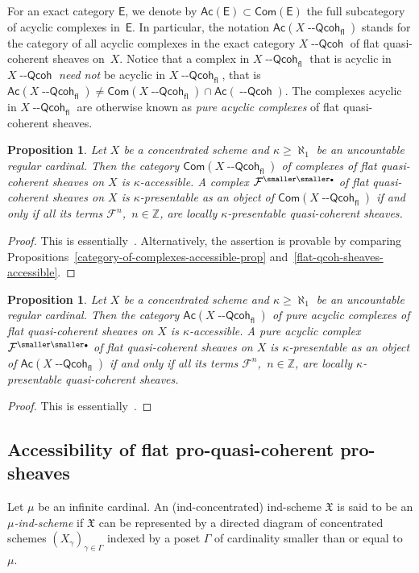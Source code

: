 \documentclass[12pt,a4paper]{amsart}
\newcommand{\+}{\protect\nobreakdash-}
\renewcommand{\:}{\colon}
\newcommand{\bu}{{\text{\smaller\smaller$\scriptstyle\bullet$}}}
\newcommand{\Qcoh}{{\operatorname{\mathsf{--Qcoh}}}}
\newcommand{\fl}{\mathsf{fl}}
\newcommand{\Com}{\mathsf{Com}}
\newcommand{\Ac}{\mathsf{Ac}}
\newcommand{\sE}{\mathsf E}
\newcommand{\cF}{\mathcal F}
\newcommand{\fX}{\mathfrak X}
\newcommand{\boZ}{\mathbb Z}
\theoremstyle{plain}
\newtheorem{prop}[thm]{Proposition}
\theoremstyle{definition}
\begin{document}
 For an exact category $\sE$, we denote by $\Ac(\sE)\subset\Com(\sE)$
the full subcategory of acyclic complexes in\/~$\sE$.
 In particular, the notation $\Ac(X\Qcoh_\fl)$ stands for the category
of all acyclic complexes in the exact category $X\Qcoh$ of flat
quasi-coherent sheaves on~$X$.
 Notice that a complex in $X\Qcoh_\fl$ that is acyclic in $X\Qcoh$
\emph{need not} be acyclic in $X\Qcoh_\fl$, that is
$\Ac(X\Qcoh_\fl)\ne\Com(X\Qcoh_\fl)\cap\Ac(\Qcoh)$.
 The complexes acyclic in $X\Qcoh_\fl$ are otherwise known as
\emph{pure acyclic complexes} of flat quasi-coherent sheaves.

\begin{prop} \label{complexes-of-flat-qcoh-sheaves-accessible}
 Let $X$ be a concentrated scheme and\/ $\kappa\ge\aleph_1$ be
an uncountable regular cardinal.
 Then the category\/ $\Com(X\Qcoh_\fl)$ of complexes of flat
quasi-coherent sheaves on $X$ is\/ $\kappa$\+accessible.
 A complex\/ $\cF^\bu$ of flat quasi-coherent sheaves on $X$ is\/
$\kappa$\+presentable as an object of\/ $\Com(X\Qcoh_\fl)$ if and
only if all its terms\/ $\cF^n$, \,$n\in\boZ$, are locally\/
$\kappa$\+presentable quasi-coherent sheaves.
\end{prop}

\begin{proof}
 This is essentially~\cite[Theorem~5.1]{PS6}.
 Alternatively, the assertion is provable by comparing
Propositions~\ref{category-of-complexes-accessible-prop}
and~\ref{flat-qcoh-sheaves-accessible}.
\end{proof}

\begin{prop} \label{pure-acycl-cmplxs-of-flat-qcoh-sheaves-accessible}
 Let $X$ be a concentrated scheme and\/ $\kappa\ge\aleph_1$ be
an uncountable regular cardinal.
 Then the category\/ $\Ac(X\Qcoh_\fl)$ of pure acyclic complexes of
flat quasi-coherent sheaves on $X$ is\/ $\kappa$\+accessible.
 A pure acyclic complex\/ $\cF^\bu$ of flat quasi-coherent sheaves on
$X$ is\/ $\kappa$\+presentable as an object of\/ $\Ac(X\Qcoh_\fl)$
if and only if all its terms\/ $\cF^n$, \,$n\in\boZ$, are locally\/
$\kappa$\+presentable quasi-coherent sheaves.
\end{prop}

\begin{proof}
  This is essentially~\cite[Theorem~5.2]{PS6}.
\end{proof}

\subsection{Accessibility of flat pro-quasi-coherent pro-sheaves}
\label{accessibility-of-flat-proqcoh-prosheaves-subsecn}
 Let $\mu$ be an infinite cardinal.
 An (ind-concentrated) ind-scheme $\fX$ is said to be
an \emph{$\mu$\+ind-scheme} if $\fX$ can be represented by a directed
diagram of concentrated schemes $(X_\gamma)_{\gamma\in\Gamma}$ indexed
by a poset $\Gamma$ of cardinality smaller than or equal to~$\mu$.
\end{document}
